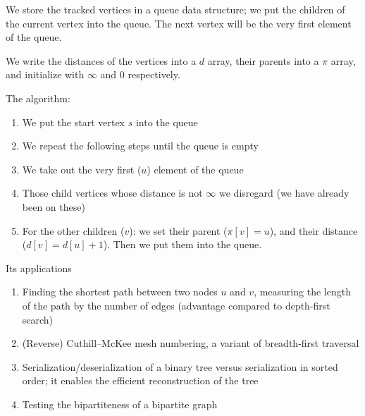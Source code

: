 \documentclass[margin=0px]{article}
\begin{document}
We store the tracked vertices in a queue data structure; we put the children of the current vertex into the queue. The next vertex will be the very first element of the queue.

We write the distances of the vertices into a $d$ array, their parents into a $\pi$ array, and initialize with $\infty$ and $0$ respectively.
\begin{flushleft}
The algorithm:
\end{flushleft}
\begin{enumerate}
    \item We put the start vertex $s$ into the queue
    \item We repeat the following steps until the queue is empty
    \item We take out the very first ($u$) element of the queue
    \item Those child vertices whose distance is not $\infty$ we disregard (we have already been on these)
    \item For the other children ($v$): we set their parent ($\pi[v] = u$), and their distance ($d[v] = d[u]+1$). Then we put them into the queue.
\end{enumerate}
Its applications
\begin{enumerate}
	\item Finding the shortest path between two nodes $u$ and $v$, measuring the length of the path by the number of edges (advantage compared to depth-first search)
	\item (Reverse) Cuthill–McKee mesh numbering, a variant of breadth-first traversal
	\item Serialization/deserialization of a binary tree versus serialization in sorted order; it enables the efficient reconstruction of the tree
	\item Testing the bipartiteness of a bipartite graph
\end{enumerate}
\end{document}
